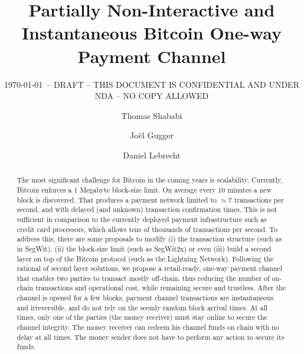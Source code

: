 \documentclass{llncs}
\begin{document}
\title{Partially Non-Interactive and Instantaneous Bitcoin One-way Payment
Channel}

\author{Thomas Shababi \and Jo\"el Gugger \and Daniel Lebrecht}


\subtitle{{\normalsize\today{\small\ -- DRAFT -- THIS DOCUMENT IS CONFIDENTIAL
AND UNDER NDA -- NO COPY ALLOWED}}}


\maketitle

\begin{abstract} The most significant challenge for Bitcoin in the coming years
  is scalability. Currently, Bitcoin enforces a 1 Megabyte block-size limit. On
  average every 10 minutes a new block is discovered. That produces a payment
  network limited to $\approx7$ transactions per second, and with delayed (and
  unknown) transaction confirmation times. This is not sufficient in comparison
  to the currently deployed payment infrastructure such as credit card
  processors, which allows tens of thousands of transactions per second. To
  address this, there are some proposals to modify (i) the transaction structure
  (such as in SegWit), (ii) the block-size limit (such as SegWit2x) or even
  (iii) build a second layer on top of the Bitcoin protocol (such as the
  Lightning Network). Following the rational of second layer solutions, we
  propose a retail-ready, one-way payment channel that enables two parties to
  transact mostly off-chain, thus reducing the number of on-chain transactions
  and operational cost, while remaining secure and trustless. After the channel
  is opened for a few blocks, payment channel transactions are instantaneous and
  irreversible, and do not rely on the seemly random block arrival times. At all
  times, only one of the parties (the money receiver) must stay online to secure
  the channel integrity. The money receiver can redeem his channel funds on
  chain with no delay at all times. The money sender does not have to perform
  any action to secure its funds. 
\end{abstract}
%
\end{document}

